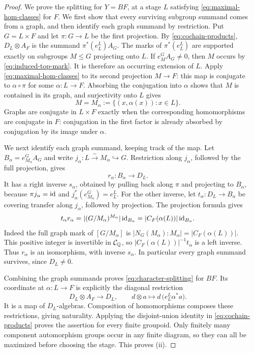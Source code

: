 \begin{proof}
We prove the splitting for $Y=BF$, at a stage $L$ satisfying
\eqref{eq:maximal-hom-classes} for $F$.  We first show that every surviving
subgroup summand comes from a graph, and then identify each graph summand
by restriction.  Put $G=L\times F$ and let
$\pi:G\to L$ be the first projection.  By
\eqref{eq:cochain-products},
$D_L\otimes A_F$ is the summand $\pi^*(e_L^L)A_G$.
The marks of $\pi^*(e_L^L)$ are supported exactly on subgroups
$M\le G$ projecting onto $L$.  If $e_M^G A_G\ne0$, then $M$ occurs by
\eqref{eq:induced-top-mark}.  It is therefore an occurring extension of
$L$.  Apply \eqref{eq:maximal-hom-classes} to its second projection
$M\to F$: this map is conjugate to $\alpha\circ\pi$ for some
$\alpha:L\to F$.  Absorbing the conjugation into $\alpha$ shows that
$M$ is contained in its graph, and surjectivity onto $L$ gives
\[
 M=M_\alpha:=\{(x,\alpha(x)):x\in L\}.
\]
Graphs are conjugate in $L\times F$ exactly when the corresponding
homomorphisms are conjugate in $F$: conjugation in the first factor is
already absorbed by conjugation by its image under $\alpha$.

We next identify each graph summand, keeping track of the map.
Let $B_\alpha=e_{M_\alpha}^G A_G$ and write
$j_\alpha:L\xrightarrow{\sim}M_\alpha\hookrightarrow G$.
Restriction along $j_\alpha$, followed by the full projection, gives
\[
 r_\alpha:B_\alpha\longrightarrow D_L.
\]
It has a right inverse $s_\alpha$, obtained by pulling back along
$\pi$ and projecting to $B_\alpha$, because
$\pi j_\alpha=\mathrm{id}$ and
$j_\alpha^*(e_{M_\alpha}^G)=e_L^L$.
For the other inverse, let $t_\alpha:D_L\to B_\alpha$ be covering
transfer along $j_\alpha$, followed by projection.  The projection
formula gives
\[
 t_\alpha r_\alpha
  = |(G/M_\alpha)^{M_\alpha}|\,\mathrm{id}_{B_\alpha}
  = |C_F(\alpha(L))|\,\mathrm{id}_{B_\alpha}.
\]
Indeed the full graph mark of $[G/M_\alpha]$ is
$|N_G(M_\alpha):M_\alpha|=|C_F(\alpha(L))|$.
This positive integer is invertible in $\mathcal C_{\mathbb Q}$, so
$|C_F(\alpha(L))|^{-1}t_\alpha$ is a left inverse.
Thus $r_\alpha$ is an isomorphism, with inverse $s_\alpha$.
In particular every graph summand survives, since $D_L\ne0$.

Combining the graph summands proves
\eqref{eq:character-splitting} for $BF$.  Its coordinate at
$\alpha:L\to F$ is explicitly the diagonal restriction
\begin{equation}\label{eq:character-evaluation}
 D_L\otimes A_F\longrightarrow D_L,
 \qquad d\otimes a\longmapsto d\,\bigl(e_L^L\alpha^*a\bigr).
\end{equation}
It is a map of $D_L$-algebras.  Composition of homomorphisms composes
these restrictions, giving naturality.  Applying the disjoint-union
identity in \eqref{eq:cochain-products} proves the assertion for every
finite groupoid.  Only finitely many component automorphism groups
occur in any finite diagram, so they can all be maximized before
choosing the stage.  This proves \textup{(ii)}.
\end{proof}

